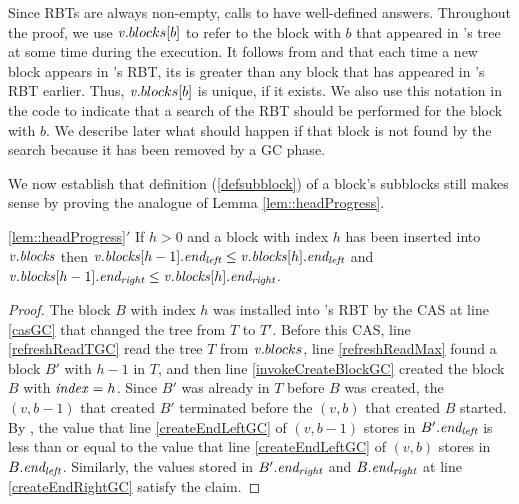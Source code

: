 Since RBTs are always non-empty, calls to  have well-defined answers.  
Throughout the proof, we use $\mbox{\textnormal{\textit{v}}}.blocks[b]$ to refer to the block with  $b$ that appeared
in 's tree at some time during the execution.
It follows from  and  that 
each time a new block appears in 's RBT, its  is greater than any block
that has appeared in 's RBT earlier.
Thus, $\mbox{\textnormal{\textit{v}}}.blocks[b]$ is unique, if it exists.
We also use this notation in the code to indicate that a search of the RBT should be performed for the block
with  $b$.
We describe later what should happen if that block is not found by the search because it has been removed
by a GC phase.

We now establish that definition (\ref{defsubblock}) of a block's subblocks
still makes sense by proving the analogue of Lemma \ref{lem::headProgress}.



\begin{customlemma}{\ref{lem::headProgress}$'$}\label{lem::headProgressGC}
 If $h>0$ and a block with index $h$ has been inserted into $\mbox{\textnormal{\textit{v}}}.\mbox{\textit{blocks}}$ then 
 $\mbox{\textnormal{\textit{v}}}.\mbox{\textit{blocks}}[h-1].\mbox{\textit{end\textsubscript{left}}} \leq \mbox{\textnormal{\textit{v}}}.\mbox{\textit{blocks}}[h].\mbox{\textit{end\textsubscript{left}}}$ and 
 $\mbox{\textnormal{\textit{v}}}.\mbox{\textit{blocks}}[h-1].\mbox{\textit{end\textsubscript{right}}} \leq \mbox{\textnormal{\textit{v}}}.\mbox{\textit{blocks}}[h].\mbox{\textit{end\textsubscript{right}}}$.
\end{customlemma}
\begin{proof}
The block $B$ with index $h$ was installed into 's RBT by the CAS at line \ref{casGC} 
that changed the tree from $T$ to $T'$.
Before this CAS, line \ref{refreshReadTGC} read the tree $T$ from $\mbox{\textnormal{\textit{v}}}.blocks$,
line \ref{refreshReadMax} found a block $B'$  with  $h-1$ in $T$,
and then line \ref{invokeCreateBlockGC} created the block $B$ with $\mbox{\textit{index}}=h$.
Since $B'$ was already in $T$ before $B$ was created, the
$(v,b-1)$ that created $B'$ terminated before the 
$(v,b)$ that created $B$ started.
By , the value that line \ref{createEndLeftGC} of $(v,b-1)$ 
stores in $B'.\mbox{\textit{end\textsubscript{left}}}$ is less than or equal to the value that line \ref{createEndLeftGC} 
of $(v,b)$ stores in $B.\mbox{\textit{end\textsubscript{left}}}$.  
Similarly, the values stored in $B'.\mbox{\textit{end\textsubscript{right}}}$ and $B.\mbox{\textit{end\textsubscript{right}}}$ at line \ref{createEndRightGC} satisfy the claim.
\end{proof}

